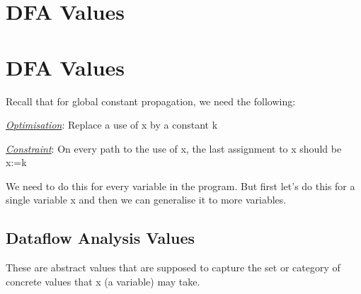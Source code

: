 \section{DFA Values}

\setlength{\parindent}{0pt}

\maketitle

\section{DFA Values}

Recall that for global constant propagation, we need the following:

\vspace{0.3cm}

\underline{\textit{Optimisation}}: Replace a use of x by a constant k

\underline{\textit{Constraint}}: On every path to the use of x, the last assignment to x should be x:=k

\vspace{0.3cm}

We need to do this for every variable in the program. But first let's do this for a single variable x and then we can generalise it to more variables.

\subsection{Dataflow Analysis Values}

These are abstract values that are supposed to capture the set or category of concrete values that x (a variable) may take.

\vspace{0.5cm}

